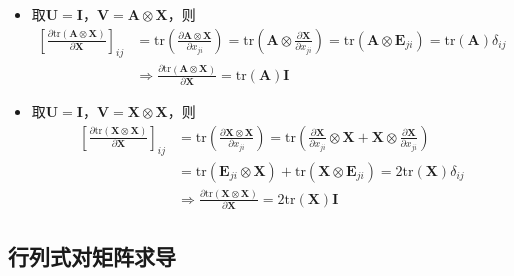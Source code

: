 \documentclass{ctexart}
\theoremstyle{definition}
\def \Av {\mathbf{A}}
\def \Ev {\mathbf{E}}
\def \Iv {\mathbf{I}}
\def \Uv {\mathbf{U}}
\def \Vv {\mathbf{V}}
\def \Xv {\mathbf{X}}
\def \tr {\mathrm{tr}}
\begin{document}
\begin{itemize}
    \item 取$\Uv = \Iv$，$\Vv = \Av \otimes \Xv$，则
          \begin{align*}
              \left[ \frac{\partial \tr(\Av \otimes \Xv)}{\partial \Xv} \right]_{ij} & = \tr \left( \frac{\partial \Av \otimes \Xv}{\partial x_{ji}} \right) = \tr \left( \Av \otimes \frac{\partial \Xv}{\partial x_{ji}} \right) = \tr ( \Av \otimes \Ev_{ji} ) = \tr(\Av) \delta_{ij} \\
                                                                                     & \Longrightarrow \frac{\partial \tr(\Av \otimes \Xv)}{\partial \Xv} = \tr(\Av) \Iv
          \end{align*}
    \item 取$\Uv = \Iv$，$\Vv = \Xv \otimes \Xv$，则
          \begin{align*}
              \left[ \frac{\partial \tr(\Xv \otimes \Xv)}{\partial \Xv} \right]_{ij} & = \tr \left( \frac{\partial \Xv \otimes \Xv}{\partial x_{ji}} \right) = \tr \left( \frac{\partial \Xv}{\partial x_{ji}} \otimes \Xv + \Xv \otimes \frac{\partial \Xv}{\partial x_{ji}} \right) \\
                                                                                     & = \tr ( \Ev_{ji} \otimes \Xv ) + \tr ( \Xv \otimes \Ev_{ji} ) = 2 \tr(\Xv) \delta_{ij}                                                                                                         \\
                                                                                     & \Longrightarrow \frac{\partial \tr(\Xv \otimes \Xv)}{\partial \Xv} = 2 \tr(\Xv) \Iv
          \end{align*}
\end{itemize}

\subsection{行列式对矩阵求导}
\end{document}
